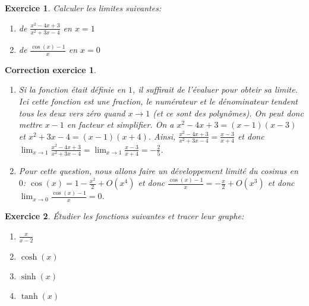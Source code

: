 \documentclass[12pt]{article}
\newtheorem{exercice}{\bf Exercice}
\newtheorem{correction}{\bf Correction exercice}
\newenvironment{exo}{
\begin{exercice}\smallskip\normalfont}{\end{exercice}
}
\newenvironment{cor}{
\begin{correction}\smallskip\normalfont}{\end{correction}
}
\newif\ifcorrige\corrigetrue
\begin{document}
\begin{exo} Calculer les limites suivantes:
\begin{multicols}{2}
\begin{enumerate}
\item de $\frac{x^2-4x+3}{x^2+3x-4}$ en $x=1$
\item de $\frac{\cos(x) - 1}{x}$ en $x=0$
\end{enumerate}
\end{multicols}
\end{exo}

\ifcorrige
\color{magenta}
\begin{cor}
$\qquad$
\begin{enumerate}
\item Si la fonction \'etait d\'efinie en $1$, il suffirait de l'\'evaluer pour obteir sa limite.
  Ici cette fonction est une fraction, le num\'erateur et le d\'enominateur tendent tous les deux vers z\'ero
  quand $x \to 1$ (et ce sont des polyn\^omes).
  On peut donc mettre $x-1$ en facteur et simplifier.
  On a $x^2-4x+3 = (x-1)(x-3)$ et $x^2+3x-4 = (x-1)(x+4)$.
  Ainsi, $\frac{x^2-4x+3}{x^2+3x-4} = \frac{x-3}{x+4}$
  et donc $\lim_{x \to 1} \frac{x^2-4x+3}{x^2+3x-4} = \lim_{x \to 1} \frac{x-3}{x+4} = - \frac25$.

\item Pour cette question, nous allons faire un d\'eveloppement limit\'e du cosinus en $0$:
  $\cos(x) = 1 - \frac{x^2}{2} + O(x^4)$ et donc
  $\frac{\cos(x) - 1}{x} = - \frac{x}{2} + O(x^3)$
  et donc $\lim_{x \to 0} \frac{\cos(x)-1}{x} = 0$.
\end{enumerate}
\end{cor}
\color{black}
\fi



\begin{exo} \'Etudier les fonctions suivantes et tracer leur graphe:
\begin{multicols}{4}
\begin{enumerate}
\item $\frac{x}{x-2}$
\item $\cosh(x)$
\item $\sinh(x)$
\item $\tanh(x)$
\end{enumerate}
\end{multicols}
\end{exo}
\end{document}

